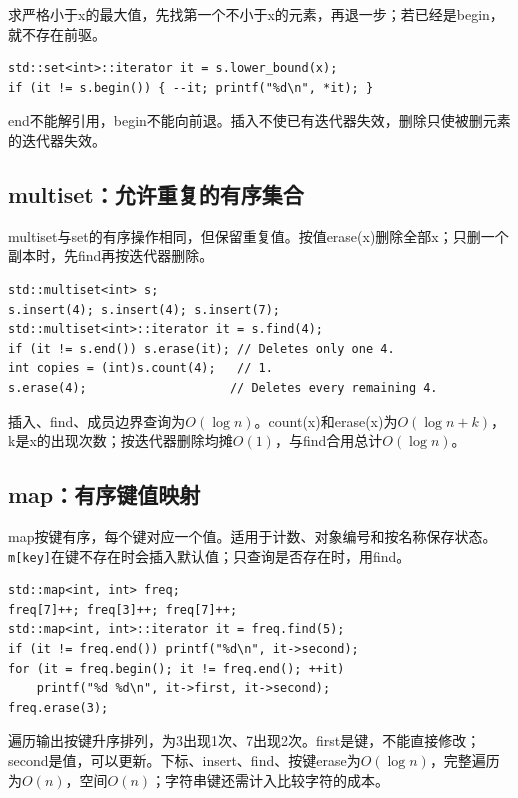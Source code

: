 \documentclass[UTF8,11pt,a4paper,fontset=none]{ctexart}
\begin{document}
求严格小于x的最大值，先找第一个不小于x的元素，再退一步；若已经是begin，就不存在前驱。
\par\noindent\begin{minipage}{\linewidth}
\begin{lstlisting}
std::set<int>::iterator it = s.lower_bound(x);
if (it != s.begin()) { --it; printf("%d\n", *it); }
\end{lstlisting}
\end{minipage}\par
end不能解引用，begin不能向前退。插入不使已有迭代器失效，删除只使被删元素的迭代器失效。

\subsection{multiset：允许重复的有序集合}
multiset与set的有序操作相同，但保留重复值。按值erase(x)删除全部x；只删一个副本时，先find再按迭代器删除。
\par\noindent\begin{minipage}{\linewidth}
\begin{lstlisting}
std::multiset<int> s;
s.insert(4); s.insert(4); s.insert(7);
std::multiset<int>::iterator it = s.find(4);
if (it != s.end()) s.erase(it); // Deletes only one 4.
int copies = (int)s.count(4);   // 1.
s.erase(4);                    // Deletes every remaining 4.
\end{lstlisting}
\end{minipage}\par
插入、find、成员边界查询为$O(\log n)$。count(x)和erase(x)为$O(\log n+k)$，k是x的出现次数；按迭代器删除均摊$O(1)$，与find合用总计$O(\log n)$。

\subsection{map：有序键值映射}
map按键有序，每个键对应一个值。适用于计数、对象编号和按名称保存状态。\texttt{m[key]}在键不存在时会插入默认值；只查询是否存在时，用find。
\par\noindent\begin{minipage}{\linewidth}
\begin{lstlisting}
std::map<int, int> freq;
freq[7]++; freq[3]++; freq[7]++;
std::map<int, int>::iterator it = freq.find(5);
if (it != freq.end()) printf("%d\n", it->second);
for (it = freq.begin(); it != freq.end(); ++it)
    printf("%d %d\n", it->first, it->second);
freq.erase(3);
\end{lstlisting}
\end{minipage}\par
遍历输出按键升序排列，为3出现1次、7出现2次。first是键，不能直接修改；second是值，可以更新。下标、insert、find、按键erase为$O(\log n)$，完整遍历为$O(n)$，空间$O(n)$；字符串键还需计入比较字符的成本。
\end{document}
